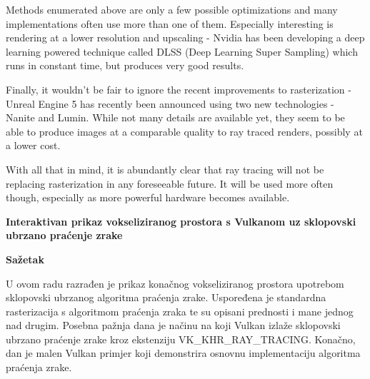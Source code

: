 \documentclass[times, utf8, zavrsni, numeric]{fer}
\begin{document}
Methods enumerated above are only a few possible optimizations and many implementations often use more than one of them. Especially interesting is rendering at a lower resolution and upscaling - Nvidia has been developing a deep learning powered technique called DLSS (Deep Learning Super Sampling) which runs in constant time, but produces very good results.

Finally, it wouldn't be fair to ignore the recent improvements to rasterization - Unreal Engine 5 \cite{unreal} has recently been announced using two new technologies - Nanite and Lumin. While not many details are available yet, they seem to be able to produce images at a comparable quality to ray traced renders, possibly at a lower cost.

With all that in mind, it is abundantly clear that ray tracing will not be replacing rasterization in any foreseeable future. It will be used more often though, especially as more powerful hardware becomes available.




\newpage
\vspace*{\fill}
\thispagestyle{empty}
\begin{center}
	{\bf Interaktivan prikaz vokseliziranog prostora s Vulkanom uz sklopovski ubrzano praćenje zrake}
\end{center}
\hspace*{\fill} {\bf Sa\v{z}etak} \hspace*{\fill} \par
\vspace*{25pt}

U ovom radu razrađen je prikaz konačnog vokseliziranog prostora upotrebom sklopovski ubrzanog algoritma praćenja zrake. Uspoređena je standardna rasterizacija s algoritmom praćenja zraka te su opisani prednosti i mane jednog nad drugim. Posebna pažnja dana je načinu na koji Vulkan izlaže sklopovski ubrzano praćenje zrake kroz ekstenziju VK\_KHR\_RAY\_TRACING. Konačno, dan je malen Vulkan primjer koji demonstrira osnovnu implementaciju algoritma praćenja zrake.


\begin{abstract}
This paper explores the real-time representation of finite voxelized space using hardware-accelerated ray tracing. It compares standard rasterization to ray tracing and outlines the benefits and drawbacks of one over the other. It's explored how Vulkan exposes hardware ray tracing capabilities through its  VK\_KHR\_RAY\_TRACING extension. Finally, a small Vulkan example is given that shows a basic implementation of the ray tracing algorithm.

\end{abstract}
\end{document}
